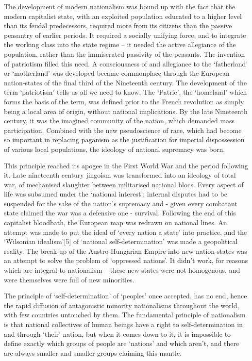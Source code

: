 The development of modern nationalism was bound up with the fact that the modern capitalist state, with an exploited population educated to a higher level than its feudal predecessors, required more from its citizens than the passive peasantry of earlier periods. It required a socially unifying force, and to integrate the working class into the state regime – it needed the active allegiance of the population, rather than the immiserated passivity of the peasants. The invention of patriotism filled this need. A consciousness of and allegiance to the ‘fatherland’ or ‘motherland’ was developed became commonplace through the European nation-states of the final third of the Nineteenth century. The development of the term ‘patriotism’ tells us all we need to know. The ‘Patrie’, the ‘homeland’ which forms the basis of the term, was defined prior to the French revolution as simply being a local area of origin, without national implications. By the late Nineteenth century, it was the imagined community of the nation, which demanded mass participation. Combined with the new pseudoscience of race, which had become so important in replacing paganism as the justification for imperial dispossession of various local populations, the ideology of national supremacy was born.

This principle reached its apogee in the First World War and the period following it. Late nineteenth century jingoism was transformed into an ideology of total war, of mechanised slaughter between militarised national blocs. Every aspect of life was subsumed under the ‘national interest’; internal disputes had to be suspended for the sake of the nation’s supremacy and - given every combatant state claimed the war was a defensive one - survival. Following the end of this capitalist bloodbath, the European map was redrawn on national lines. An attempt was made to put the ideal of ‘every nation a state’ into practice, and the ‘Wilsonian idealism’[5] of ‘national self-determination’ was made a geopolitical reality. The break-up of the Austro-Hungarian Empire into new nation-states was an attempt to solve the problem of ‘oppressed nations’. It didn’t work, for reasons which are integral to nationalism – these new states were not homogenous, and were themselves were full of new minorities.

The principle of ‘self-determination’ of ‘peoples’ once accepted, has no end, hence the rapid diffusion of antagonistic minority nationalisms throughout the world, with few countries untouched by them. The fundamental principle of nationalism is that national collectives of human beings have a right to self-determination in and through ‘their’ nation, but when it comes down to it, it is impossible to define exactly which groups of people are ‘nations’ and which aren’t, and there are always smaller and smaller groups claiming this mantle.

